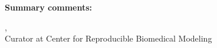 \documentclass{article}
\begin{document}
\newpage
\bigskip
\noindent
\textbf{Summary comments:} 


\bigskip
\bigskip
\bigskip
\noindent
{}\footnotemark, 
\\
Curator at Center for Reproducible Biomedical Modeling
\end{document}
